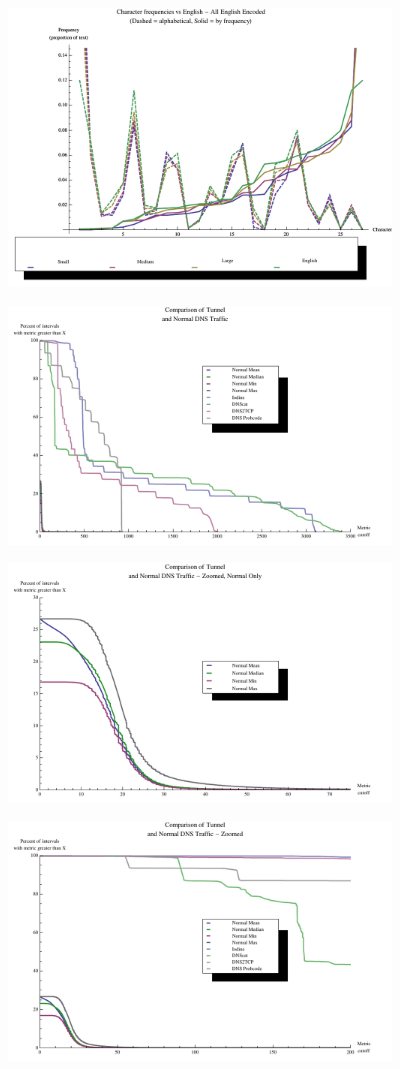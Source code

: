 \documentclass[12pt]{report}
\theoremstyle{remark}
\theoremstyle{definition}
\theoremstyle{definition}
\theoremstyle{definition}
\begin{document}
\begin{figure}
\centering
\includegraphics[width=4in]{figures/markov-a.pdf}
\end{figure}
\begin{figure}
\centering
\includegraphics[width=4in]{figures/metric-tun_v_norm.pdf}
\end{figure}
\begin{figure}
\centering
\includegraphics[width=4in]{figures/metric-tun_v_norm-norm-zoom.pdf}
\end{figure}
\begin{figure}
\centering
\includegraphics[width=4in]{figures/metric-tun_v_norm-zoom.pdf}
\end{figure}
\end{document}
